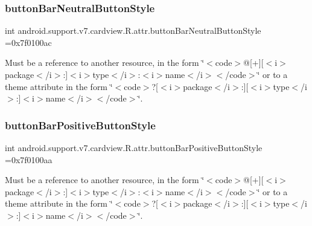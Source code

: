 \subsubsection{\texorpdfstring{button\+Bar\+Neutral\+Button\+Style}{buttonBarNeutralButtonStyle}}
{\footnotesize\ttfamily int android.\+support.\+v7.\+cardview.\+R.\+attr.\+button\+Bar\+Neutral\+Button\+Style =0x7f0100ac\hspace{0.3cm}{\ttfamily [static]}}

Must be a reference to another resource, in the form \char`\"{}$<$code$>$@\mbox{[}+\mbox{]}\mbox{[}$<$i$>$package$<$/i$>$\+:\mbox{]}$<$i$>$type$<$/i$>$\+:$<$i$>$name$<$/i$>$$<$/code$>$\char`\"{} or to a theme attribute in the form \char`\"{}$<$code$>$?\mbox{[}$<$i$>$package$<$/i$>$\+:\mbox{]}\mbox{[}$<$i$>$type$<$/i$>$\+:\mbox{]}$<$i$>$name$<$/i$>$$<$/code$>$\char`\"{}. \mbox{\label{classandroid_1_1support_1_1v7_1_1cardview_1_1R_1_1attr_a1de975827f0146bb24d27f277bfabeef}} 
\subsubsection{\texorpdfstring{button\+Bar\+Positive\+Button\+Style}{buttonBarPositiveButtonStyle}}
{\footnotesize\ttfamily int android.\+support.\+v7.\+cardview.\+R.\+attr.\+button\+Bar\+Positive\+Button\+Style =0x7f0100aa\hspace{0.3cm}{\ttfamily [static]}}

Must be a reference to another resource, in the form \char`\"{}$<$code$>$@\mbox{[}+\mbox{]}\mbox{[}$<$i$>$package$<$/i$>$\+:\mbox{]}$<$i$>$type$<$/i$>$\+:$<$i$>$name$<$/i$>$$<$/code$>$\char`\"{} or to a theme attribute in the form \char`\"{}$<$code$>$?\mbox{[}$<$i$>$package$<$/i$>$\+:\mbox{]}\mbox{[}$<$i$>$type$<$/i$>$\+:\mbox{]}$<$i$>$name$<$/i$>$$<$/code$>$\char`\"{}. \mbox{\label{classandroid_1_1support_1_1v7_1_1cardview_1_1R_1_1attr_ab1d867a0e1fdb554c96a74370d222077}} 
